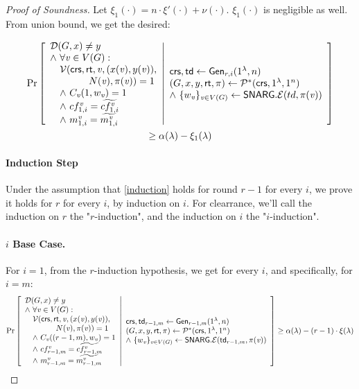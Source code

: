 \begin{proof}[Proof of Soundness]
Let $\xi_1(\cdot) = n\cdot \xi'(\cdot) + \nu(\cdot)$. $\xi_1(\cdot)$ is negligible as well. From union bound, we get the desired:

\begin{gather*}
    \Pr \left[ \begin{array}{ll} 
    \mathcal{D}(G, x)\neq y \\
    \wedge\ \forall \mathit{ v }\in V(G) : \\
    \quad 
        \mathcal{V}(\mathsf{crs}, \mathsf{rt}, \mathit{ v }, (x(\mathit{ v }), y(\mathit{ v })),\\
        \qquad \qquad N(\mathit{ v }), \pi(\mathit{ v })) = 1 \\
        \quad \wedge ~ C_{\mathit{ v }}(1, w_{\mathit{ v }}) = 1 \\
        \quad \wedge ~cf^{\mathit{ v }}_{1,i} = \widetilde{cf^{\mathit{ v }}_{1,i}} \\
        \quad \wedge ~m^{\mathit{ v }}_{1,i} = \widetilde{m^{\mathit{ v }}_{1,i}}
     \end{array} \middle\vert \begin{array}{ll} 
    \mathsf{crs}, \mathsf{td} \leftarrow \mathsf{Gen}_{r,i}(1^\lambda, n) \\
    (G, x, y, \mathsf{rt}, \pi) \leftarrow \mathcal{P}^*(\mathsf{crs}, 1^\lambda, 1^n) \\
    \wedge ~\{w_{\mathit{ v }}\}_{\mathit{ v }\in V(G)}\leftarrow \mathsf{SNARG}.\mathcal{E}(td, \pi(\mathit{ v }))
     \end{array} \right] \\ \geq \alpha(\lambda) - \xi_1(\lambda)
\end{gather*}

\paragraph{Induction Step} Under the assumption that \cref{induction} holds for round $r-1$ for every $i$, we prove it holds for $r$ for every $i$, by induction on $i$. For clearrance, we'll call the induction on $r$ the "$r$-induction", and the induction on $i$ the "$i$-induction".

\paragraph{$i$ Base Case.} For $i=1$, from the $r$-induction hypothesis, we get for every $i$, and specifically, for $i=m$:
\begin{gather*}
    \Pr \left[ \begin{array}{ll} 
    \mathcal{D}(G, x)\neq y  \\
    \wedge\ \forall \mathit{ v }\in V(G) : \\
    \quad \mathcal{V}(\mathsf{crs}, \mathsf{rt}, \mathit{ v }, (x(\mathit{ v }), y(\mathit{ v })),\\
    \qquad \qquad N(\mathit{ v }), \pi(\mathit{ v })) = 1 \\
    \quad \wedge ~C_{\mathit{ v }}((r-1, m), w_{\mathit{ v }}) = 1 \\
    \quad \wedge ~cf^{\mathit{ v }}_{r-1, m} = \widetilde{cf^{\mathit{ v }}_{r-1,m}} \\
    \quad \wedge ~m^{\mathit{ v }}_{r-1,m} = \widetilde{m^{\mathit{ v }}_{r-1,m}}
     \end{array} \middle\vert \begin{array}{ll} 
    \mathsf{crs}, \mathsf{td}_{r-1,m} \leftarrow \mathsf{Gen}_{r-1,m}(1^\lambda, n) \\
    (G, x, y, \mathsf{rt}, \pi) \leftarrow \mathcal{P}^*(\mathsf{crs}, 1^\lambda, 1^n)\\
    \wedge ~\{w_{\mathit{ v }}\}_{\mathit{ v }\in V(G)}\leftarrow \mathsf{SNARG}.\mathcal{E}(\mathsf{td}_{r-1,m}, \pi(\mathit{ v }))
     \end{array} \right] \geq \alpha(\lambda) - (r-1)\cdot\xi(\lambda)
\end{gather*}


\end{proof}
